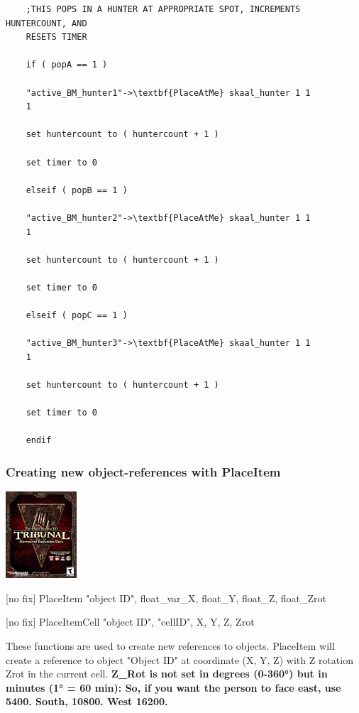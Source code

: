 \begin{lstlisting}
	;THIS POPS IN A HUNTER AT APPROPRIATE SPOT, INCREMENTS HUNTERCOUNT, AND
	RESETS TIMER
	
	if ( popA == 1 )
	
	"active_BM_hunter1"->\textbf{PlaceAtMe} skaal_hunter 1 1
	1
	
	set huntercount to ( huntercount + 1 )
	
	set timer to 0
	
	elseif ( popB == 1 )
	
	"active_BM_hunter2"->\textbf{PlaceAtMe} skaal_hunter 1 1
	1
	
	set huntercount to ( huntercount + 1 )
	
	set timer to 0
	
	elseif ( popC == 1 )
	
	"active_BM_hunter3"->\textbf{PlaceAtMe} skaal_hunter 1 1
	1
	
	set huntercount to ( huntercount + 1 )
	
	set timer to 0
	
	endif
\end{lstlisting}

\hypertarget{creating-new-object-references-with-placeitem}{%
\subsubsection{Creating new object-references with
PlaceItem}\label{creating-new-object-references-with-placeitem}}

\includegraphics{media/image6.png}

{[}no fix{]} PlaceItem "object ID", float\_var\_X, float\_Y, float\_Z,
float\_Zrot

{[}no fix{]} PlaceItemCell "object ID", "cellID", X, Y, Z, Zrot


These functions are used to create new references to objects. PlaceItem
will create a reference to object "Object ID" at coordinate (X, Y, Z)
with Z rotation Zrot in the current cell. \textbf{Z\_Rot is not set in
degrees (0-360°) but in minutes (1° = 60 min): So, if you want the
person to face east, use 5400. South, 10800. West 16200.}

